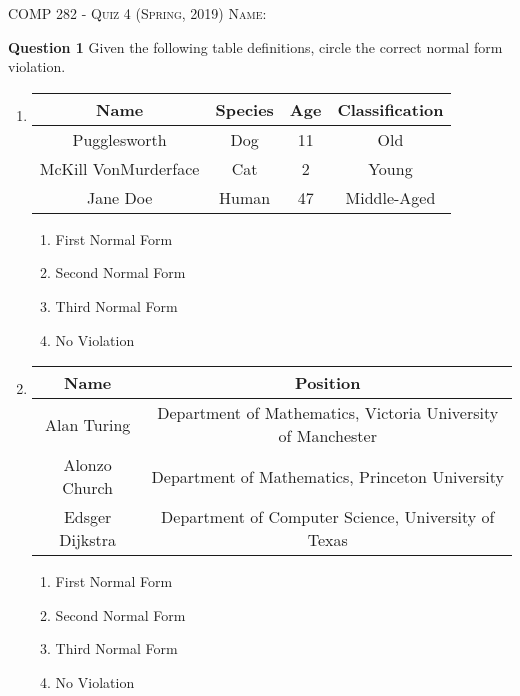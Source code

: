 \documentclass{letter}
\newcommand{\heading}[1]{{\large \textsc{#1}}}
\begin{document}
\heading{COMP 282 - Quiz 4 (Spring, 2019)}
\kern 2cm
\heading{Name:}

{\bf Question 1} \kern 1cm Given the following table definitions, circle the
correct normal form violation.

\begin{enumerate}[label=(\alph*)]

\item
\begin{tabular}{ c | c | c | c }
Name & Species & Age & Classification \\
\hline
Pugglesworth & Dog & 11 & Old \\
McKill VonMurderface & Cat & 2 & Young \\
Jane Doe & Human & 47 & Middle-Aged \\
\end{tabular}

\vspace{0.5cm}

\begin{enumerate}[label=(\roman*)]
\item First Normal Form
\item Second Normal Form
\item Third Normal Form
\item No Violation
\end{enumerate}

\vspace{0.5cm}

\item
\begin{tabular}{ c | c }
Name & Position \\
\hline
Alan Turing & Department of Mathematics, Victoria University of Manchester \\
Alonzo Church & Department of Mathematics, Princeton University \\
Edsger Dijkstra & Department of Computer Science, University of Texas \\
\end{tabular}

\vspace{0.5cm}

\begin{enumerate}[label=(\roman*)]
\item First Normal Form
\item Second Normal Form
\item Third Normal Form
\item No Violation
\end{enumerate}


\end{enumerate}
\end{document}
